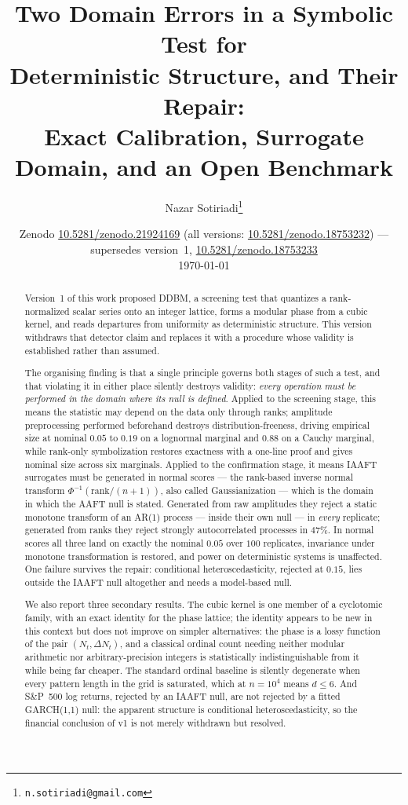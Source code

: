 \documentclass[11pt]{article}
\title{\bfseries Two Domain Errors in a Symbolic Test for\\
Deterministic Structure, and Their Repair:\\[4pt]
\large Exact Calibration, Surrogate Domain, and an Open Benchmark}
\author{Nazar Sotiriadi\thanks{\texttt{n.sotiriadi@gmail.com}}}
\date{Zenodo \href{https://doi.org/10.5281/zenodo.21924169}{10.5281/zenodo.21924169} (all versions:
\href{https://doi.org/10.5281/zenodo.18753232}{10.5281/zenodo.18753232}) --- supersedes version~1,
\href{https://doi.org/10.5281/zenodo.18753233}{10.5281/zenodo.18753233}\\[2pt]
\today}
\begin{document}
\maketitle

\begin{abstract}
\noindent
Version~1 of this work proposed DDBM, a screening test that quantizes a
rank-normalized scalar series onto an integer lattice, forms a modular phase
from a cubic kernel, and reads departures from uniformity as deterministic
structure. This version withdraws that detector claim and replaces it with a
procedure whose validity is established rather than assumed.

The organising finding is that a single principle governs both stages of such a
test, and that violating it in either place silently destroys validity:
\emph{every operation must be performed in the domain where its null is
defined}. Applied to the screening stage, this means the statistic may depend on
the data only through ranks; amplitude preprocessing performed beforehand
destroys distribution-freeness, driving empirical size at nominal $0.05$ to
$0.19$ on a lognormal marginal and $0.88$ on a Cauchy marginal, while
rank-only symbolization restores exactness with a one-line proof and gives
nominal size across six marginals. Applied to the confirmation stage, it means
IAAFT surrogates must be generated in normal scores --- the rank-based inverse
normal transform $\Phi^{-1}(\mathrm{rank}/(n+1))$, also called Gaussianization
--- which is the domain in which the AAFT null is stated. Generated from raw amplitudes they reject a static
monotone transform of an AR(1) process --- inside their own null --- in
\emph{every} replicate; generated from ranks they reject strongly autocorrelated
processes in $47\%$. In normal scores all three land on exactly the nominal $0.05$ over $100$
replicates, invariance under monotone transformation is restored, and power on
deterministic systems is unaffected. One failure survives the repair:
conditional heteroscedasticity, rejected at $0.15$, lies outside the IAAFT null
altogether and needs a model-based null.

We also report three secondary results. The cubic kernel is one member of a
cyclotomic family, with an exact identity for the phase lattice; the identity
appears to be new in this context but does not improve on simpler alternatives:
the phase is a lossy function of the pair $(N_t,\Delta N_t)$, and a classical
ordinal count needing neither modular arithmetic nor arbitrary-precision
integers is statistically indistinguishable from it while being far cheaper. The standard ordinal baseline is silently degenerate when every
pattern length in the grid is saturated, which at $n=10^4$ means $d\le 6$. And
S\&P~500 log returns, rejected by an IAAFT null, are not rejected by a fitted
GARCH(1,1) null: the apparent structure is conditional heteroscedasticity, so
the financial conclusion of v1 is not merely withdrawn but resolved.


\end{abstract}
\end{document}
